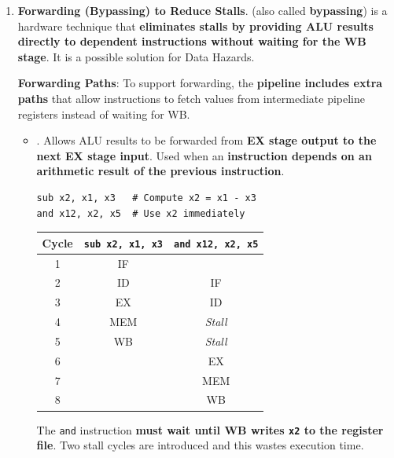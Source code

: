 \begin{enumerate}[label=\textcolor{Green3}{\faIcon{check}}]
   \item \textcolor{Green3}{\textbf{Forwarding (Bypassing) to Reduce Stalls}}.  (also called \textbf{bypassing}) is a hardware technique that \textbf{eliminates stalls by providing ALU results directly to dependent instructions without waiting for the WB stage}. It is a possible solution for Data Hazards.

   \textcolor{Green3}{\faIcon{\speedIcon} \textbf{Forwarding Paths}}: To support forwarding, the \textbf{pipeline includes extra paths} that allow instructions to fetch values from intermediate pipeline registers instead of waiting for WB.
   \begin{itemize}
      \item {}. Allows ALU results to be forwarded from \textbf{EX stage output to the next EX stage input}. Used when an \textbf{instruction depends on an arithmetic result of the previous instruction}.
      \begin{examplebox}[: EX/EX Forwarding]
         \begin{lstlisting}
sub x2, x1, x3   # Compute x2 = x1 - x3
and x12, x2, x5  # Use x2 immediately\end{lstlisting}
         \begin{center}
            \begin{tabular}{@{} c | c | c @{}}
               \toprule
               \textbf{Cycle} & \texttt{sub x2, x1, x3} & \texttt{and x12, x2, x5} \\
               \midrule
               1 & IF  & \\
               2 & ID  & IF      \\ [.3em]
               3 & EX  & ID      \\ [.3em]
               4 & MEM & \emph{Stall} \\ [.3em]
               5 & WB  & \emph{Stall} \\ [.3em]
               6 &     & EX      \\ [.3em]
               7 &     & MEM     \\ [.3em]
               8 &     & WB      \\
               \bottomrule
            \end{tabular}
         \end{center}
         The \texttt{and} instruction \textbf{must wait until WB writes \texttt{x2} to the register file}. Two stall cycles are introduced and this wastes execution time.


\end{examplebox}
\end{itemize}
\end{enumerate}
